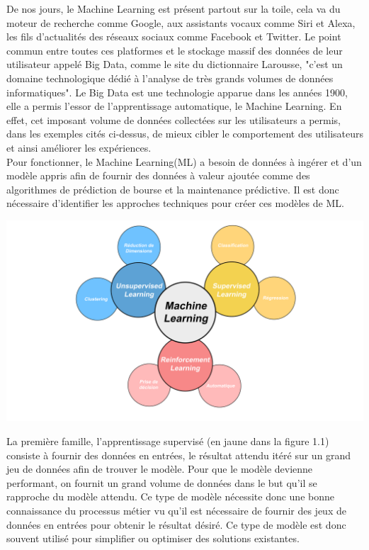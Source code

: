 \documentclass[12pt,a4paper,french]{report}
\begin{document}
De nos jours, le Machine Learning est présent partout sur la toile, cela va du moteur de recherche comme Google, aux assistants vocaux comme Siri et Alexa, les fils d'actualités des réseaux sociaux comme Facebook et Twitter. Le point commun entre toutes ces platformes et le stockage massif des données de leur utilisateur appelé Big Data, comme le site du dictionnaire Larousse, "c'est un domaine technologique dédié à l'analyse de très grands volumes de données informatiques". Le Big Data est une technologie apparue dans les années 1900, elle a permis l'essor de l'apprentissage automatique, le Machine Learning. En effet, cet imposant volume de données collectées sur les utilisateurs a permis, dans les exemples cités ci-dessus, de mieux cibler le comportement des utilisateurs et ainsi améliorer les expériences.\\

Pour fonctionner, le Machine Learning(ML) a besoin de données à ingérer et d'un modèle appris afin de fournir des données à valeur ajoutée comme des algorithmes de prédiction de bourse et la maintenance prédictive. Il est donc nécessaire d'identifier les approches techniques pour créer ces modèles de ML.\\

\begin{center}
	\includegraphics[scale=0.2]{ML_vignette}
	\label{fig1}
\end{center}

La première famille, l'apprentissage supervisé (en jaune dans la figure 1.1) consiste à fournir des données en entrées, le résultat attendu itéré sur un grand jeu de données afin de trouver le modèle. Pour que le modèle devienne performant, on fournit un grand volume de données dans le but qu'il se rapproche du modèle attendu. Ce type de modèle nécessite donc une bonne connaissance du processus métier vu qu'il est nécessaire de fournir des jeux de données en entrées pour obtenir le résultat désiré. Ce type de modèle est donc souvent utilisé pour simplifier ou optimiser des solutions existantes.\\
\end{document}
